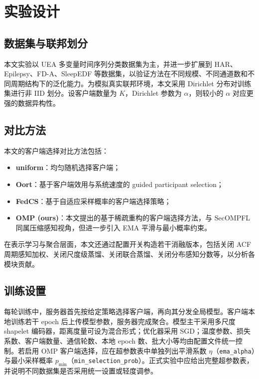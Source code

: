 \documentclass{article}
\begin{document}
\section{实验设计}

\subsection{数据集与联邦划分}

本文实验以 UEA 多变量时间序列分类数据集为主，并进一步扩展到 HAR、Epilepsy、FD-A、SleepEDF 等数据集，以验证方法在不同规模、不同通道数和不同周期结构下的泛化能力。为模拟真实联邦环境，本文采用 Dirichlet 分布对训练集进行非 IID 划分。设客户端数量为 $K$，Dirichlet 参数为 $\alpha$，则较小的 $\alpha$ 对应更强的数据异构性。

\subsection{对比方法}

本文的客户端选择对比方法包括：
\begin{itemize}[leftmargin=2em]
    \item \textbf{uniform}：均匀随机选择客户端\cite{fedavg}；
    \item \textbf{Oort}\cite{oort}：基于客户端效用与系统速度的 guided participant selection；
    \item \textbf{FedCS}\cite{fedcsadaptive}：基于自适应采样概率的客户端选择策略；
    \item \textbf{OMP (ours)}：本文提出的基于稀疏重构的客户端选择方法，与 SecOMPFL\cite{secompfl} 同属压缩感知视角，但进一步引入 EMA 平滑与最小概率约束。
\end{itemize}

在表示学习与聚合层面，本文还通过配置开关构造若干消融版本，包括关闭 ACF 周期感知加权、关闭尺度级蒸馏、关闭联合蒸馏、关闭分布感知分数等，以分析各模块贡献。

\subsection{训练设置}

每轮训练中，服务器首先按给定策略选择客户端，再向其分发全局模型。客户端本地训练若干 epoch 后上传模型参数，服务器完成聚合。模型主干采用多尺度 shapelet 编码器，距离度量可设为混合形式；优化器采用 SGD；温度参数、损失系数、客户端数量、通信轮数、本地 epoch 数、批大小等均由配置文件统一控制。若启用 OMP 客户端选择，应在超参数表中单独列出平滑系数 $\eta$（\texttt{ema\_alpha}）与最小采样概率 $p_{\min}$（\texttt{min\_selection\_prob}）。正式实验中应给出完整超参数表，并说明不同数据集是否采用统一设置或轻度调参。
\end{document}
